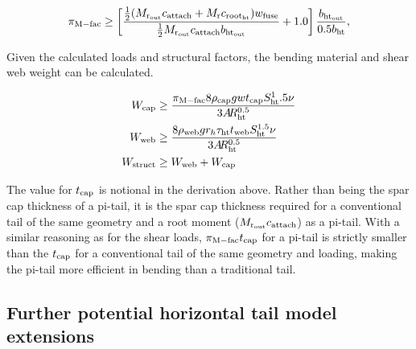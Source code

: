 \begin{equation}
    \pi_{\rm{M-fac}} \geq \left[\frac{\frac{1}{2}(M_{\rm{r}_{\rm{out}}} c_{\rm{attach}} +
    M_{\rm{r}} c_{\rm{root}_{\rm{ht}}}) w_{\textrm{fuse}}} {\frac{1}{2}M_{\rm{r}_{\rm{out}}} c_{\rm{attach}} 
b_{\rm{ht}_{\rm{out}}}} + 1.0\right]
    \frac{b_{\rm{ht}_{\rm{out}}}} {0.5b_{\rm{ht}}},
\end{equation}

Given the calculated loads and structural factors, the bending material and 
shear web weight can be calculated. 

\begin{align}
    W_{\rm{cap}} &\geq \frac{\pi_{\rm{M-fac}} 8 \rho_{\rm{cap}} g w t_{\rm{cap}} S_{\rm{ht}}^1.5 \nu}
    {3A\hspace{-2.0pt}R_{\rm{ht}}^{0.5}}\\
    W_{\rm{web}} &\geq \frac{8 \rho_{\rm{web}} g r_h \tau_{\rm{ht}} t_{\rm{web}} S_{\rm{ht}}^{1.5} 
\nu}{3A\hspace{-2.0pt}R_{\rm{ht}}^{0.5}}\\
    W_{\rm{struct}} &\geq W_{\rm{web}} + W_{\rm{cap}}
\end{align}

The value for $t_{\rm{cap}}$ is notional in the derivation above. Rather than being 
the spar cap thickness of a pi-tail, it is the spar cap thickness required for a 
conventional tail of the same geometry and a root moment  ($M_{\rm{r}_{\rm{out}}} 
c_{\rm{attach}}$) as a pi-tail. With a similar reasoning as for the shear loads, 
$\pi_{\rm{M-fac}} t_{\rm{cap}}$ for a pi-tail is strictly smaller than the $t_{\rm{cap}}$ for a 
conventional tail of the same geometry and loading, making the pi-tail more 
efficient in bending than a traditional tail. 

\subsection{Further potential horizontal tail model extensions}
\label{sec:HTExtensions}
